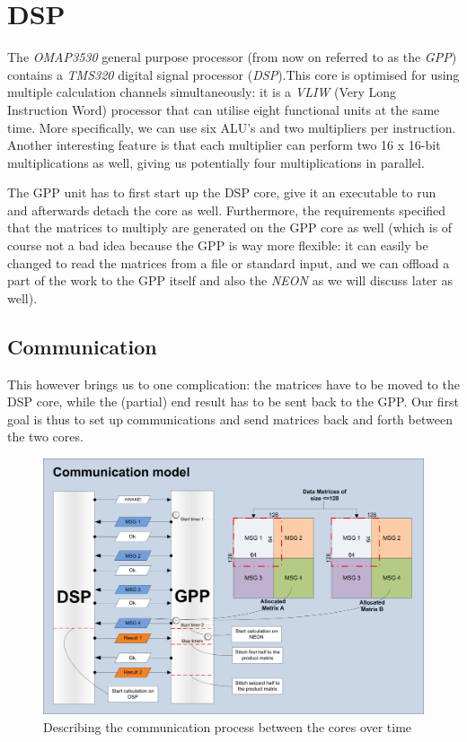 \section{DSP}
The \emph{OMAP3530} general purpose processor (from now on referred to as the
\emph{GPP}) contains a \emph{TMS320} digital signal processor (\emph{DSP}).This
core is optimised for using multiple calculation channels simultaneously: it is
a \emph{VLIW} (Very Long Instruction Word) processor that can utilise eight
functional units at the same time. More specifically, we can use six ALU's and
two multipliers per instruction. Another interesting feature is that each
multiplier can perform two 16 x 16-bit multiplications as well, giving us
potentially four multiplications in parallel.

The GPP unit has to first start up the DSP core, give it an executable to run
and afterwards detach the core as well. Furthermore, the requirements specified
that the matrices to multiply are generated on the GPP core as well (which is 
of course not a bad idea because the GPP is way more flexible: it can easily
be changed to read the matrices from a file or standard input, and we can
offload a part of the work to the GPP itself and also the \emph{NEON} as we 
will discuss later as well). 

\subsection{Communication}
This however brings us to one complication: the matrices have to be moved to
the DSP core, while the (partial) end result has to be sent back to the GPP.
Our first goal is thus to set up communications and send matrices back and forth
between the two cores. 

\begin{figure}[h]
\includegraphics[width=\textwidth]{gpp_dsp_com}
\caption{Describing the communication process between the cores over time}
\label{fig:gpp_dsp_com}
\end{figure}

